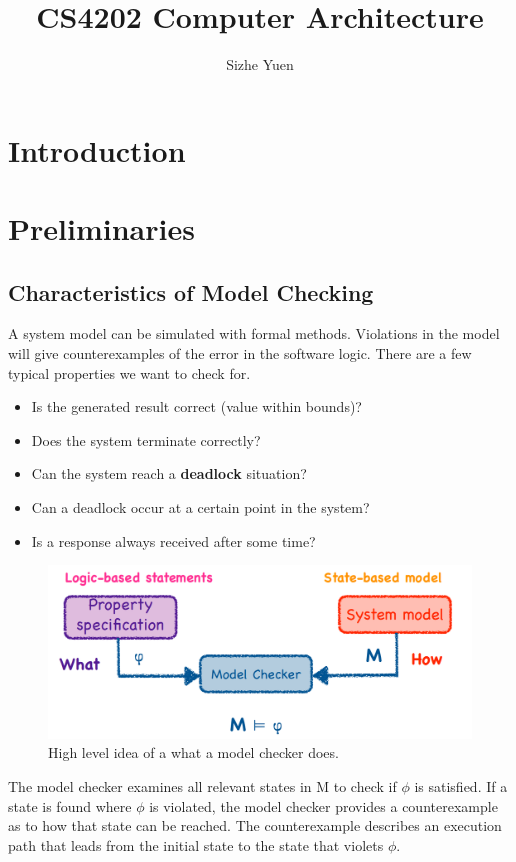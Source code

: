 \documentclass[11pt]{article}
\author{Sizhe Yuen}
\title{CS4202 Computer Architecture}
\begin{document}
\maketitle
\tableofcontents

\newcommand{\n}[0]{\\[\baselineskip]}

\section{Introduction}


\section{Preliminaries}

\subsection{Characteristics of Model Checking}
A system model can be simulated with formal methods. Violations in the model will give counterexamples of the error in the software logic. There are a few typical properties we want to check for.
\begin{itemize}
\item Is the generated result correct (value within bounds)?
\item Does the system terminate correctly?
\item Can the system reach a \textbf{deadlock} situation?
\item Can a deadlock occur at a certain point in the system?
\item Is a response always received after some time?
\end{itemize}

\begin{figure}[H]
\centering
\includegraphics[width=1\textwidth, keepaspectratio]{imgs/model-checker-logic.png}
\caption{High level idea of a what a model checker does.}
\end{figure}
\noindent
The model checker examines all relevant states in M to check if $\phi$ is satisfied. If a state is found where $\phi$ is violated, the model checker provides a counterexample as to how that state can be reached. The counterexample describes an execution path that leads from the initial state to the state that violets $\phi$. 
\n
\end{document}
